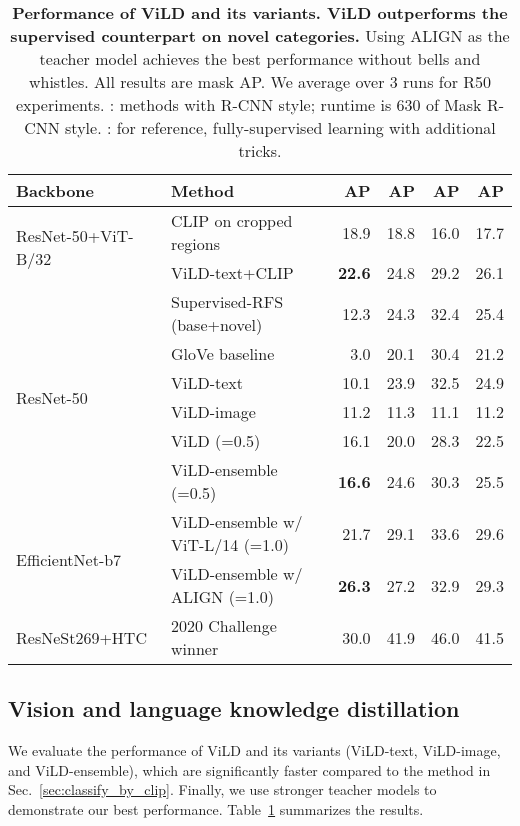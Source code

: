 \documentclass{article} \usepackage{iclr2022_conference,times}
\begin{document}
\begin{table}[h]
\caption{
\textbf{Performance of ViLD and its variants. ViLD outperforms the supervised counterpart on novel categories.}
Using ALIGN as the teacher model achieves the best performance without bells and whistles. 
All results are mask AP. We average over 3 runs for R50 experiments.
: methods with R-CNN style; runtime is 630 of Mask R-CNN style.
: for reference, fully-supervised learning with additional tricks.
}
\label{table:main_results}
\vspace{-1ex}
\centering
{\footnotesize
\begin{tabular}{llr>{\color{gray}}r>{\color{gray}}r>{\color{gray}}r}

\toprule
Backbone & Method  & AP &  AP & AP & AP\\
\midrule
\multirow{2}{*}{ResNet-50+ViT-B/32} & CLIP on cropped regions  & 18.9 & 18.8 & 16.0 & 17.7 \\
& ViLD-text+CLIP & \textbf{22.6} & 24.8 & 29.2 & 26.1\\
\hline
\multirow{6}{*}{ResNet-50} & Supervised-RFS (base+novel)  & 12.3 &	24.3 &	32.4 & 25.4\\
& GloVe baseline & 	3.0	& 20.1 & 30.4 & 21.2\\
& ViLD-text &  10.1	& 23.9 &	32.5 & 24.9\\
& ViLD-image & 11.2 & 	11.3 & 	11.1 & 11.2\\
& ViLD (=0.5) & 16.1 &	20.0 &	28.3 & 22.5\\
& ViLD-ensemble (=0.5) & \textbf{16.6} & 24.6 & 30.3 & 25.5\\
\hline
\multirow{2}{*}{EfficientNet-b7} & ViLD-ensemble w/ ViT-L/14 (=1.0) & 21.7 &	29.1 & 33.6 & 29.6\\
 & ViLD-ensemble w/ ALIGN (=1.0) & \textbf{26.3} &	27.2 & 32.9 & 29.3\\
\hline
ResNeSt269+HTC & 2020 Challenge winner~\citep{huang2020joint}  & 30.0 & 41.9 &	46.0 & 41.5\\
\bottomrule
\end{tabular}
}
\vspace{-2ex}
\end{table}


\subsection{Vision and language knowledge distillation}\label{sec:exp_vild}
We evaluate the performance of ViLD and its variants (ViLD-text, ViLD-image, and ViLD-ensemble), which are significantly faster compared to the method in Sec.~\ref{sec:classify_by_clip}.
Finally, we use stronger teacher models to demonstrate our best performance. Table~\ref{table:main_results} summarizes the results.
\end{document}
